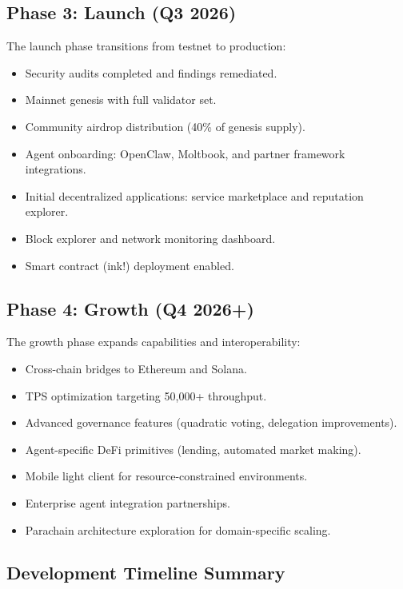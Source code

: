 \subsection{Phase 3: Launch (Q3 2026)}

The launch phase transitions from testnet to production:

\begin{itemize}[nosep]
    \item Security audits completed and findings remediated.
    \item Mainnet genesis with full validator set.
    \item Community airdrop distribution (40\% of genesis supply).
    \item Agent onboarding: OpenClaw, Moltbook, and partner framework integrations.
    \item Initial decentralized applications: service marketplace and reputation explorer.
    \item Block explorer and network monitoring dashboard.
    \item Smart contract (ink!) deployment enabled.
\end{itemize}

\subsection{Phase 4: Growth (Q4 2026+)}

The growth phase expands capabilities and interoperability:

\begin{itemize}[nosep]
    \item Cross-chain bridges to Ethereum and Solana.
    \item TPS optimization targeting 50{,}000+ throughput.
    \item Advanced governance features (quadratic voting, delegation improvements).
    \item Agent-specific DeFi primitives (lending, automated market making).
    \item Mobile light client for resource-constrained environments.
    \item Enterprise agent integration partnerships.
    \item Parachain architecture exploration for domain-specific scaling.
\end{itemize}

\subsection{Development Timeline Summary}

